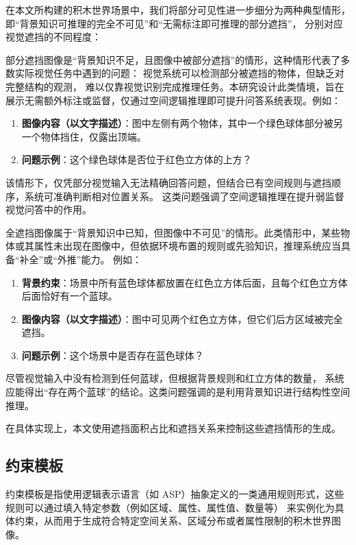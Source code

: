 在本文所构建的积木世界场景中，我们将部分可见性进一步细分为两种典型情形，即“背景知识可推理的完全不可见”和“无需标注即可推理的部分遮挡”，
分别对应视觉遮挡的不同程度：

部分遮挡图像是“背景知识不足，且图像中被部分遮挡”的情形，这种情形代表了多数实际视觉任务中遇到的问题：
视觉系统可以检测部分被遮挡的物体，但缺乏对完整结构的观测，
难以仅靠视觉识别完成推理任务。本研究设计此类情境，旨在展示无需额外标注或监督，仅通过空间逻辑推理即可提升问答系统表现。例如：
\begin{enumerate}[nosep]
\item \textbf{图像内容（以文字描述）}：图中左侧有两个物体，其中一个绿色球体部分被另一个物体挡住，仅露出顶端。
\item \textbf{问题示例}：这个绿色球体是否位于红色立方体的上方？
\end{enumerate}
该情形下，仅凭部分视觉输入无法精确回答问题，但结合已有空间规则与遮挡顺序，系统可准确判断相对位置关系。
这类问题强调了空间逻辑推理在提升弱监督视觉问答中的作用。

全遮挡图像属于“背景知识中已知，但图像中不可见”的情形。此类情形中，某些物体或其属性未出现在图像中，但依据环境布置的规则或先验知识，推理系统应当具备“补全”或“外推”能力。
例如：
\begin{enumerate}[nosep]
\item \textbf{背景约束}：场景中所有蓝色球体都放置在红色立方体后面，且每个红色立方体后面恰好有一个蓝球。
\item \textbf{图像内容（以文字描述）}：图中可见两个红色立方体，但它们后方区域被完全遮挡。
\item \textbf{问题示例}：这个场景中是否存在蓝色球体？
\end{enumerate}
尽管视觉输入中没有检测到任何蓝球，但根据背景规则和红立方体的数量，
系统应能得出“存在两个蓝球”的结论。这类问题强调的是利用背景知识进行结构性空间推理。

在具体实现上，本文使用遮挡面积占比和遮挡关系来控制这些遮挡情形的生成。
\subsection{约束模板}
约束模板是指使用逻辑表示语言（如 ASP）抽象定义的一类通用规则形式，这些规则可以通过填入特定参数（例如区域、属性、属性值、数量等）
来实例化为具体约束，从而用于生成符合特定空间关系、区域分布或者属性限制的积木世界图像。


